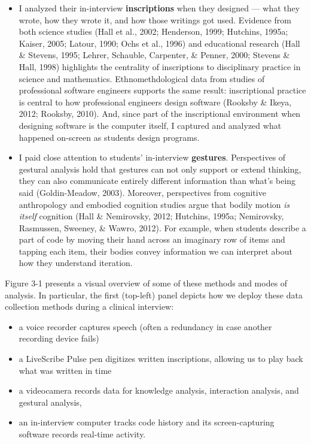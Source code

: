 \begin{itemize}
\item
  I analyzed their in-interview \textbf{inscriptions} when they designed
  --- what they wrote, how they wrote it, and how those writings got
  used. Evidence from both science studies (Hall et al., 2002;
  Henderson, 1999; Hutchins, 1995a; Kaiser, 2005; Latour, 1990; Ochs et
  al., 1996) and educational research (Hall \& Stevens, 1995; Lehrer,
  Schauble, Carpenter, \& Penner, 2000; Stevens \& Hall, 1998)
  highlights the centrality of inscriptions to disciplinary practice in
  science and mathematics. Ethnomethdological data from studies of
  professional software engineers supports the same result:
  inscriptional practice is central to how professional engineers design
  software (Rooksby \& Ikeya, 2012; Rooksby, 2010). And, since part of
  the inscriptional environment when designing software is the computer
  itself, I captured and analyzed what happened on-screen as students
  design programs.
\item
  I paid close attention to students' in-interview \textbf{gestures}.
  Perspectives of gestural analysis hold that gestures can not only
  support or extend thinking, they can also communicate entirely
  different information than what's being said (Goldin-Meadow, 2003).
  Moreover, perspectives from cognitive anthropology and embodied
  cognition studies argue that bodily motion \emph{is itself} cognition
  (Hall \& Nemirovsky, 2012; Hutchins, 1995a; Nemirovsky, Rasmussen,
  Sweeney, \& Wawro, 2012). For example, when students describe a part
  of code by moving their hand across an imaginary row of items and
  tapping each item, their bodies convey information we can interpret
  about how they understand iteration.
\end{itemize}

Figure 3-1 presents a visual overview of some of these methods and modes
of analysis. In particular, the first (top-left) panel depicts how we
deploy these data collection methods during a clinical interview:

\begin{itemize}
\item
  a voice recorder captures speech (often a redundancy in case another
  recording device fails)
\item
  a LiveScribe Pulse pen digitizes written inscriptions, allowing us to
  play back what was written in time
\item
  a videocamera records data for knowledge analysis, interaction
  analysis, and gestural analysis,
\item
  an in-interview computer tracks code history and its screen-capturing
  software records real-time activity.
\end{itemize}

